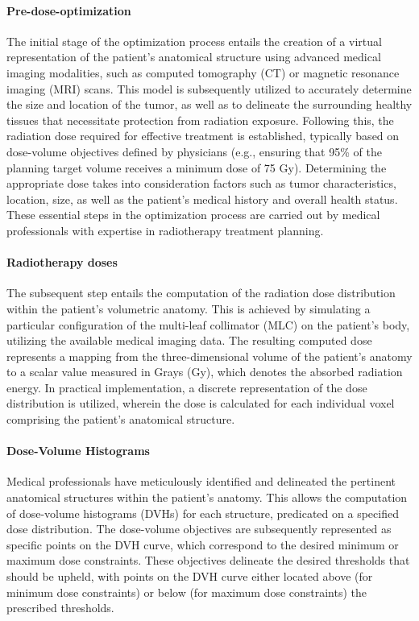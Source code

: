 \documentclass[a4paper]{article}
\begin{document}
	\paragraph{Pre-dose-optimization}
	The initial stage of the optimization process entails the creation of a virtual representation of the patient's anatomical structure using advanced medical imaging modalities, such as computed tomography (CT) or magnetic resonance imaging (MRI) scans.
	This model is subsequently utilized to accurately determine the size and location of the tumor, as well as to delineate the surrounding healthy tissues that necessitate protection from radiation exposure.
	Following this, the radiation dose required for effective treatment is established, typically based on dose-volume objectives defined by physicians (e.g., ensuring that 95\% of the planning target volume receives a minimum dose of 75 Gy).
	Determining the appropriate dose takes into consideration factors such as tumor characteristics, location, size, as well as the patient's medical history and overall health status.
	These essential steps in the optimization process are carried out by medical professionals with expertise in radiotherapy treatment planning.
	
	\paragraph{Radiotherapy doses}
	The subsequent step entails the computation of the radiation dose distribution within the patient's volumetric anatomy.
	This is achieved by simulating a particular configuration of the multi-leaf collimator (MLC) on the patient's body, utilizing the available medical imaging data.
	The resulting computed dose represents a mapping from the three-dimensional volume of the patient's anatomy to a scalar value measured in Grays (Gy), which denotes the absorbed radiation energy.
	In practical implementation, a discrete representation of the dose distribution is utilized, wherein the dose is calculated for each individual voxel comprising the patient's anatomical structure.
	
	\paragraph{Dose-Volume Histograms}
	Medical professionals have meticulously identified and delineated the pertinent anatomical structures within the patient's anatomy.
	This allows the computation of dose-volume histograms (DVHs) for each structure, predicated on a specified dose distribution.
	The dose-volume objectives are subsequently represented as specific points on the DVH curve, which correspond to the desired minimum or maximum dose constraints.
	These objectives delineate the desired thresholds that should be upheld, with points on the DVH curve either located above (for minimum dose constraints) or below (for maximum dose constraints) the prescribed thresholds.
	
\end{document}
